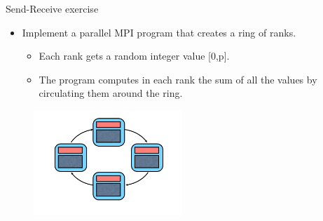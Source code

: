 \begin{frame}[fragile]{Send-Receive exercise}

\begin{itemize}
\item Implement a parallel MPI program that creates a ring of ranks. 
    \begin{itemize}
    \item Each rank gets a random integer value [0,p]. 
      \vspace{2mm}
    \item The program computes in each rank the sum of all the values by circulating them around the ring.
      \vspace{2mm}
    \end{itemize}
\end{itemize}

\begin{figure}
    \centering
    \includegraphics[width=0.5\textwidth]{img/mpiring.png}
\end{figure} 
   
 
    
\end{frame}

